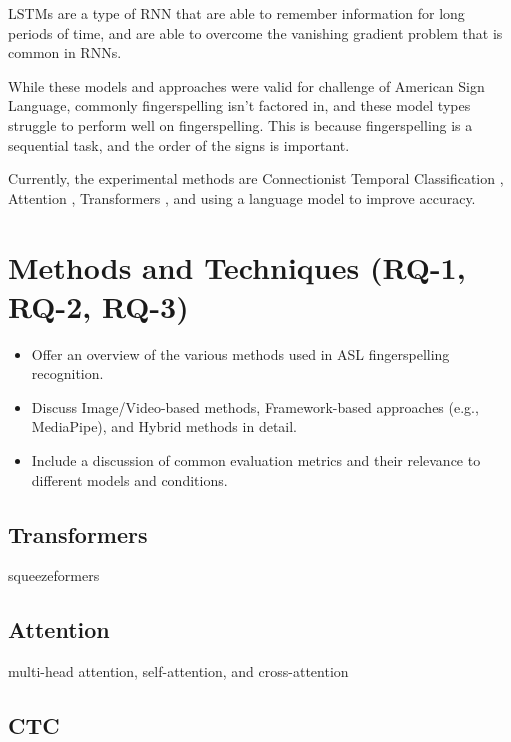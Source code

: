 LSTMs are a type of RNN that are able to remember information for long periods of time, and are able to overcome the vanishing gradient problem that is common in RNNs.


While these models and approaches were valid for challenge of American Sign Language, commonly fingerspelling isn't factored in, and these model types struggle to perform well on fingerspelling. This is because fingerspelling is a sequential task, and the order of the signs is important.

Currently, the experimental methods are Connectionist Temporal Classification \cite{gravesConnectionistTemporalClassification, shiAmericanSignLanguage2018}, Attention \cite{bahdanauNeuralMachineTranslation2016}, Transformers \cite{vaswaniAttentionAllYou2023}, and using a language model to improve accuracy.

\section{Methods and Techniques (RQ-1, RQ-2, RQ-3)}

\begin{itemize}
    \item Offer an overview of the various methods used in ASL fingerspelling recognition.
    \item Discuss Image/Video-based methods, Framework-based approaches (e.g., MediaPipe), and Hybrid methods in detail.
    \item Include a discussion of common evaluation metrics and their relevance to different models and conditions.
\end{itemize}

\subsection{Transformers}

squeezeformers

\subsection{Attention}
multi-head attention, self-attention, and cross-attention

\subsection{CTC}


